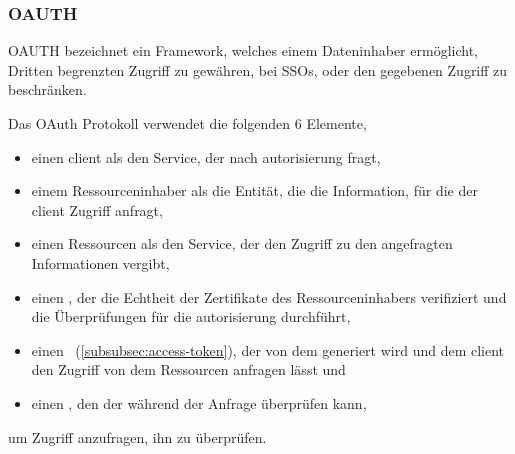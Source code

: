 \subsubsection[OAuth]{\acf{OAUTH}}\label{subsubsec:oauth}
\ac{OAUTH} bezeichnet ein Framework, welches einem Dateninhaber ermöglicht, Dritten begrenzten Zugriff zu gewähren, \zb bei \acp{SSO}, oder den gegebenen Zugriff zu beschränken.\autocites[\vglf][]{rfc6749}[\vglf][]{OAuthWebProtocol:2012}

Das OAuth Protokoll verwendet die folgenden 6 Elemente,
\begin{itemize}
    \item einen \gls{client} als den Service, der nach \gls{autorisierung} fragt,
    \item einem Ressourceninhaber als die Entität, die die Information, für die der \gls{client} Zugriff anfragt,
    \item  einen Ressourcen als den Service, der den Zugriff zu den angefragten Informationen vergibt,
    \item einen , der die Echtheit der Zertifikate des Ressourceninhabers verifiziert und die Überprüfungen für die \gls{autorisierung} durchführt,
    \item einen\  (\autoref{subsubsec:access-token}), der von dem  generiert wird und dem \gls{client} den Zugriff von dem Ressourcen anfragen lässt und
    \item einen , den der  während der Anfrage überprüfen kann,
\end{itemize}
um Zugriff anzufragen, \bzw ihn zu überprüfen.\autocite[\vglf][]{OAuthWebProtocol:2012}

